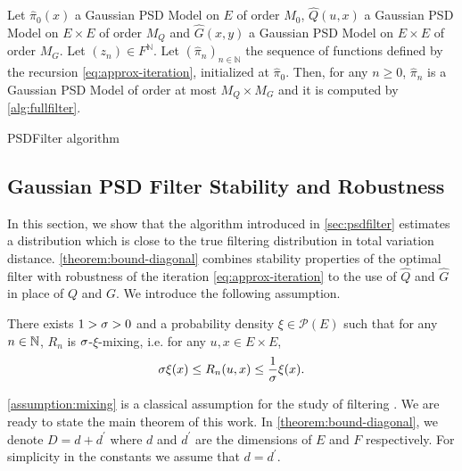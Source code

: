 \begin{corollary} \label{theorem:algorithm}
    Let $\hat \pi_0(x)$ a Gaussian PSD Model on $E$ of order $M_0$, $\hat Q(u, x)$ a Gaussian PSD Model on $E\times E$ of order $M_Q$ and $\hat G(x, y)$ a Gaussian PSD Model on $E\times E$ of order $M_G$. Let $(z_n)\in F^\mathbb N$. Let $(\hat \pi_n)_{n\in\mathbb N}$ the sequence of functions defined by the recursion \cref{eq:approx-iteration}, initialized at $\hat \pi_0$. Then, for any $n\geq 0$, $\hat \pi_n$ is a Gaussian PSD Model of order at most $M_Q \times M_G$ and it is computed by \cref{alg:fullfilter}.
\end{corollary}

\begin{algorithm}[ht!]
\caption{PSDFilter algorithm}\label{alg:fullfilter}
{}
\end{algorithm}

\subsection{Gaussian PSD Filter Stability and Robustness}\label{sec:theory}
In this section, we show that the algorithm introduced in \cref{sec:psdfilter} estimates a distribution which is close to the true filtering distribution in total variation distance. \cref{theorem:bound-diagonal} combines stability properties of the optimal filter with robustness of the iteration \cref{eq:approx-iteration} to the use of $\hat Q$ and $\hat G$ in place of $Q$ and $G$. We introduce the following assumption.

\begin{assumption}[$R_n$ is mixing]\label{assumption:mixing}
    There exists $1 >\sigma > 0$ and a probability density $\xi\in\mathcal P(E)$ such that for any $n \in\mathbb N$, $R_n$ is $\sigma$-$\xi$-mixing, i.e. for any $u, x \in E \times E$,
    \begin{align}
        \sigma \xi(x) \leq R_n(u, x) \leq \frac{1}{\sigma}\xi(x).
    \end{align}
\end{assumption}
\cref{assumption:mixing} is a classical assumption for the study of filtering \citep{cappehmm}. We are ready to state the main theorem of this work. In \cref{theorem:bound-diagonal}, we denote $D = d + d^\prime$ where $d$ and $d^\prime$ are the dimensions of $E$ and $F$ respectively. For simplicity in the constants we assume that $d = d^\prime$.

